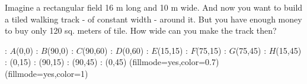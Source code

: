 
%
%
%
%
% 
% 

\question Imagine a rectangular field 16 m long and 10 m wide. And now you want
to build a tiled walking track - of constant width - around it. But you have enough 
money to buy only 120 sq. meters of tile. How wide can you make the track then?

\insertQR{}

\ifprintanswers
  \begin{marginfigure}
      : $A$(0,0)
      : $B$(90,0)
      : $C$(90,60)
      : $D$(0,60)
      : $E$(15,15)
      : $F$(75,15)
      : $G$(75,45)
      : $H$(15,45)
      : (0,15)
      : (90,15)
      : (90,45)
      : (0,45)
    \figdrawbegin{}
      \figset (fillmode=yes,color=0.7)
      \figdrawline [100,101,102,103,100]
      \figset (fillmode=yes,color=1)
      \figdrawline [104,105,106,107,104]
    \figdrawend
    \centerline{\box\figBoxA}
  \end{marginfigure}
\fi 

